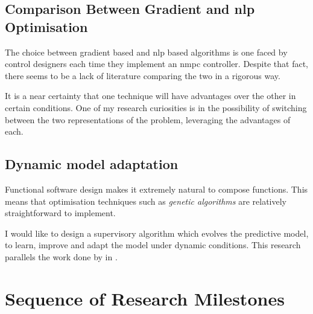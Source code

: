 \subsection{Comparison Between Gradient and \acs*{nlp} Optimisation}

The choice between gradient based and \ac{nlp} based algorithms is one faced by
control designers each time they implement an \ac{nmpc} controller. Despite that
fact, there seems to be a lack of literature comparing the two in a rigorous
way.

It is a near certainty that one technique will have advantages over the other in
certain conditions. One of my research curiosities is in the possibility of
switching between the two representations of the problem, leveraging the
advantages of each.


\subsection{Dynamic model adaptation}

Functional software design makes it extremely natural to compose functions. This
means that optimisation techniques such as \emph{genetic algorithms} are
relatively straightforward to implement.

I would like to design a supervisory algorithm which evolves the predictive
model, to learn, improve and adapt the model under dynamic conditions. This
research parallels the work done by \citeauthor{Bongard2006} in
\cite{Bongard2006}.



\section{Sequence of Research Milestones}


